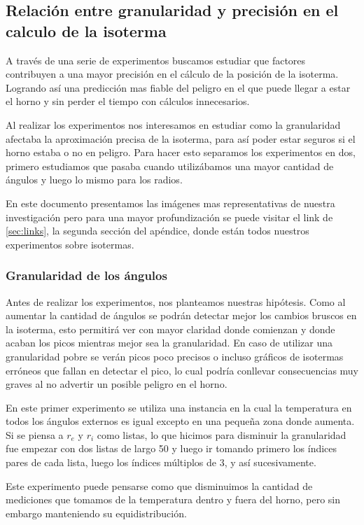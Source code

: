 \subsection{Relación entre granularidad y precisión en el calculo de la isoterma}
A través de una serie de experimentos buscamos estudiar que factores contribuyen a una mayor precisión en el cálculo de la posición de la isoterma. Logrando así una predicción mas fiable del peligro en el que puede llegar a estar el horno y sin perder el tiempo con cálculos innecesarios.


Al realizar los experimentos nos interesamos en estudiar como la granularidad afectaba la aproximación precisa de la isoterma, para así poder estar seguros si el horno estaba o no en peligro. Para hacer esto separamos los experimentos en dos, primero estudiamos que pasaba cuando utilizábamos una mayor cantidad de ángulos y luego lo mismo para los radios.

En este documento presentamos las imágenes mas representativas de nuestra investigación pero para una mayor profundización se puede visitar el link de \ref{sec:links}, la segunda sección del apéndice, donde están todos nuestros experimentos sobre isotermas.


\subsubsection{Granularidad de los ángulos}

Antes de realizar los experimentos, nos planteamos nuestras hipótesis. Como al aumentar la cantidad de ángulos se podrán detectar mejor los cambios bruscos en la isoterma, esto permitirá ver con mayor claridad donde comienzan y donde acaban los picos mientras mejor sea la granularidad. En caso de utilizar una granularidad pobre se verán picos poco precisos o incluso gráficos de isotermas erróneos que fallan en detectar el pico, lo cual podría conllevar consecuencias muy graves al no advertir un posible peligro en el horno.

En este primer experimento se utiliza una instancia en la cual la temperatura en todos los ángulos externos es igual excepto en una pequeña zona donde aumenta. 
Si se piensa a $r_e$ y $r_i$ como listas, lo que hicimos para disminuir la granularidad fue empezar con dos listas de largo 50 y luego ir tomando primero los índices pares de cada lista, luego los índices múltiplos de 3, y así sucesivamente.

Este experimento puede pensarse como que disminuimos la cantidad de mediciones que tomamos de la temperatura dentro y fuera del horno, pero sin embargo manteniendo su equidistribución.


